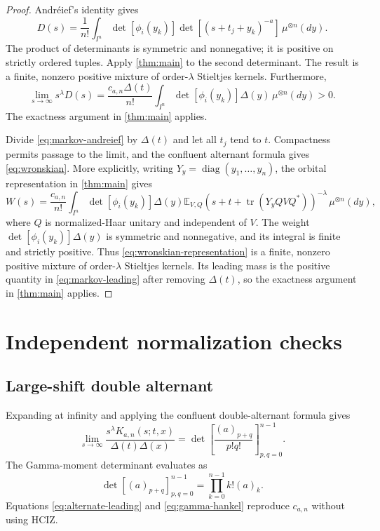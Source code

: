 \documentclass[11pt]{article}
\theoremstyle{definition}
\theoremstyle{remark}
\newcommand{\E}{\mathbb{E}}
\newcommand{\tr}{\operatorname{tr}}
\begin{document}
\begin{proof}
Andr\'eief's identity gives
\begin{equation}\label{eq:markov-andreief}
D(s)=\frac1{n!}\int_{I^n}
\det[\phi_i(y_k)]
\det[(s+t_j+y_k)^{-a}]
\,\mu^{\otimes n}(dy).
\end{equation}
The product of determinants is symmetric and nonnegative; it is positive on
strictly ordered tuples. Apply \cref{thm:main} to the second determinant.
The result is a finite, nonzero positive mixture of order-$\lambda$ Stieltjes
kernels. Furthermore,
\begin{equation}\label{eq:markov-leading}
\lim_{s\to\infty}s^\lambda D(s)
=\frac{c_{a,n}\Delta(t)}{n!}
\int_{I^n}\det[\phi_i(y_k)]\Delta(y)
\,\mu^{\otimes n}(dy)>0.
\end{equation}
The exactness argument in \cref{thm:main} applies.

Divide \eqref{eq:markov-andreief} by $\Delta(t)$ and let all $t_j$ tend to
$t$. Compactness permits passage to the limit, and the confluent alternant
formula gives \eqref{eq:wronskian}. More explicitly, writing
$Y_y=\operatorname{diag}(y_1,\ldots,y_n)$, the orbital representation in
\cref{thm:main} gives
\begin{equation}\label{eq:wronskian-representation}
W(s)=\frac{c_{a,n}}{n!}\int_{I^n}
\det[\phi_i(y_k)]\Delta(y)
\E_{V,Q}\!\left(s+t+\tr(Y_yQVQ^*)\right)^{-\lambda}
\,\mu^{\otimes n}(dy),
\end{equation}
where $Q$ is normalized-Haar unitary and independent of $V$. The weight
$\det[\phi_i(y_k)]\Delta(y)$ is symmetric and nonnegative, and its integral
is finite and strictly positive. Thus \eqref{eq:wronskian-representation} is
a finite, nonzero positive mixture of order-$\lambda$ Stieltjes kernels. Its
leading mass is the positive quantity in \eqref{eq:markov-leading} after
removing $\Delta(t)$, so the exactness argument in \cref{thm:main} applies.
\end{proof}

\section{Independent normalization checks}

\subsection{Large-shift double alternant}

Expanding at infinity and applying the confluent double-alternant formula
gives
\begin{equation}\label{eq:alternate-leading}
\lim_{s\to\infty}
\frac{s^\lambda K_{a,n}(s;t,x)}{\Delta(t)\Delta(x)}
=\det\left[\frac{(a)_{p+q}}{p!q!}\right]_{p,q=0}^{n-1}.
\end{equation}
The Gamma-moment determinant evaluates as
\begin{equation}\label{eq:gamma-hankel}
\det[(a)_{p+q}]_{p,q=0}^{n-1}
=\prod_{k=0}^{n-1}k!(a)_k.
\end{equation}
Equations \eqref{eq:alternate-leading} and \eqref{eq:gamma-hankel} reproduce
$c_{a,n}$ without using HCIZ.
\end{document}
